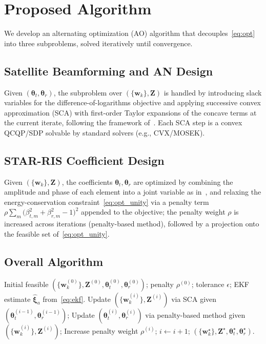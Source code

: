 \section{Proposed Algorithm}\label{sec:alg}

We develop an alternating optimization (AO) algorithm that decouples~\eqref{eq:opt} into three subproblems, solved iteratively until convergence.

\subsection{Satellite Beamforming and AN Design}
Given $(\boldsymbol{\theta}_t, \boldsymbol{\theta}_r)$, the subproblem over $(\{\mathbf{w}_k\}, \mathbf{Z})$ is handled by introducing slack variables for the difference-of-logarithms objective and applying successive convex approximation (SCA) with first-order Taylor expansions of the concave terms at the current iterate, following the framework of~\cite{zhao2025nearfield}. Each SCA step is a convex QCQP/SDP solvable by standard solvers (e.g., CVX/MOSEK).

\subsection{STAR-RIS Coefficient Design}
Given $(\{\mathbf{w}_k\}, \mathbf{Z})$, the coefficients $\boldsymbol{\theta}_t, \boldsymbol{\theta}_r$ are optimized by combining the amplitude and phase of each element into a joint variable as in~\cite{zhao2025aerial}, and relaxing the energy-conservation constraint~\eqref{eq:opt_unity} via a penalty term $\rho \sum_m \big(\beta_{t,m}^2 + \beta_{r,m}^2 - 1\big)^2$ appended to the objective; the penalty weight $\rho$ is increased across iterations (penalty-based method), followed by a projection onto the feasible set of~\eqref{eq:opt_unity}.

\subsection{Overall Algorithm}
\begin{algorithm}[t]
\caption{Proposed AO Algorithm for Problem~\eqref{eq:opt}}
\label{alg:ao}
\begin{algorithmic}[1]
\Require Initial feasible $(\{\mathbf{w}_k^{(0)}\}, \mathbf{Z}^{(0)}, \boldsymbol{\theta}_t^{(0)}, \boldsymbol{\theta}_r^{(0)})$; penalty $\rho^{(0)}$; tolerance $\epsilon$; EKF estimate $\hat{\boldsymbol{\xi}}_a$ from~\eqref{eq:ekf}.
\Repeat
    \State Update $(\{\mathbf{w}_k^{(i)}\}, \mathbf{Z}^{(i)})$ via SCA given $(\boldsymbol{\theta}_t^{(i-1)}, \boldsymbol{\theta}_r^{(i-1)})$;
    \State Update $(\boldsymbol{\theta}_t^{(i)}, \boldsymbol{\theta}_r^{(i)})$ via penalty-based method given $(\{\mathbf{w}_k^{(i)}\}, \mathbf{Z}^{(i)})$;
    \State Increase penalty weight $\rho^{(i)}$; $i \leftarrow i+1$;
\Ensure $(\{\mathbf{w}_k^\star\}, \mathbf{Z}^\star, \boldsymbol{\theta}_t^\star, \boldsymbol{\theta}_r^\star)$.
\end{algorithmic}
\end{algorithm}

